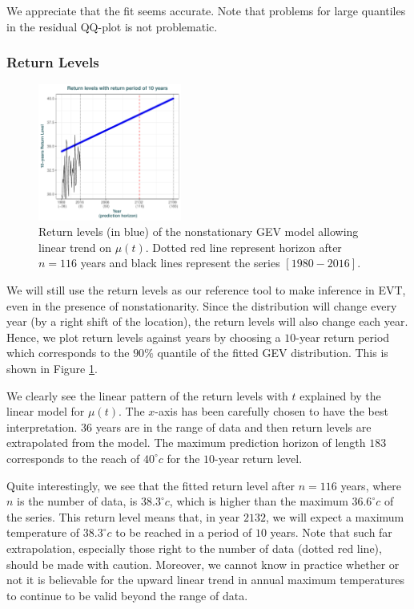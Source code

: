 We appreciate that the fit seems accurate. Note that problems for large quantiles in the residual QQ-plot is not problematic. 


\subsubsection*{Return Levels}



\begin{figure}
	\centering
	\includegraphics[width=0.42\textwidth]{rl_nsta.pdf} %
	\caption{Return levels (in blue) of the nonstationary GEV model allowing linear trend on $\mu(t)$. Dotted red line represent horizon after $n=116$ years and black lines represent the series $[1980-2016]$.  }
	\label{fig:rl_nsta}
\end{figure}

We will still use the return levels as our reference tool to make inference in EVT, even in the presence of nonstationarity. Since the distribution will change every year (by a right shift of the location), the return levels will also change each year. Hence, we plot return levels against years by choosing a $10$-year return period which corresponds to the $90\%$ quantile of the fitted GEV distribution. This is shown in Figure \ref{fig:rl_nsta}.

We clearly see the linear pattern of the return levels with $t$ explained by the linear model for $\mu(t)$. The $x$-axis has been carefully chosen to have the best interpretation. $36$ years are in the range of data and then return levels are extrapolated from the model. The maximum prediction horizon of length $183$ corresponds to the reach of $40^{\circ}c$ for the $10$-year return level. 

Quite interestingly, we see that the fitted return level after $n=116$ years, where $n$ is the number of data, is $38.3^{\circ}c$, which is higher than the maximum $36.6^{\circ}c$ of the series. 
This return level means that, in year $2132$, we will expect a maximum temperature of $38.3^{\circ}c$ to be reached in a period of $10$ years. Note that such far extrapolation, especially those right to the number of data (dotted red line), should be made with caution.
Moreover, we cannot know in practice whether or not it is believable
for the upward linear trend in annual maximum temperatures to continue to be valid beyond the range of data.

